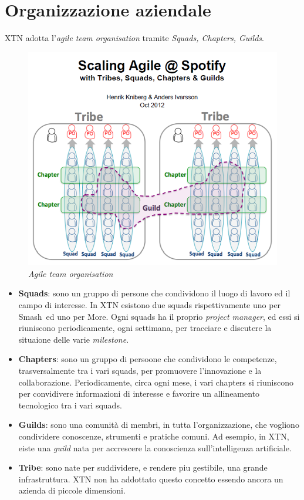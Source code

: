\section{Organizzazione aziendale}
XTN adotta l'\textit{agile team organisation} tramite \textit{Squads, Chapters, Guilds}.
\begin{figure}[ht]
	\centering
	\includegraphics[scale=0.80]{immagini/agile-org.png}
	\caption{\textit{Agile team organisation}}
\end{figure}
\begin{itemize}
\item{\textbf{Squads}:} sono un gruppo di persone che condividono il luogo di lavoro ed il campo di interesse. In XTN esistono due squads rispettivamente uno per  Smash\textregistered\ ed uno per More\textregistered. Ogni squads ha il proprio \textit{project manager}, ed essi si riuniscono periodicamente, ogni settimana, per tracciare e discutere la situaione delle varie \textit{milestone}. 
\item{\textbf{Chapters}:} sono un gruppo di persoone che condividono le competenze, trasversalmente tra i vari squads, per promuovere l'innovazione e la collaborazione. Periodicamente, circa ogni mese, i vari chapters si riuniscono per convidivere informazioni di interesse e favorire un allineamento tecnologico tra i vari squads.
\item{\textbf{Guilds}:} sono una comunità di membri, in tutta l'organizzazione, che vogliono condividere conoscenze, strumenti e pratiche comuni. Ad esempio, in XTN, eiste una \textit{guild} nata per accrescere la conoscienza sull'intelligenza artificiale.
\item{\textbf{Tribe}:} sono nate per suddividere, e rendere piu gestibile, una grande infrastruttura. XTN non ha addottato questo concetto essendo ancora un azienda di piccole dimensioni.
\end{itemize}

